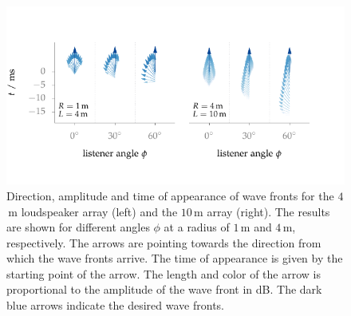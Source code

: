 \begin{figure}
    \centering
    \includegraphics{fig5_15/fig5_15}
    \caption{Direction, amplitude and time of appearance of wave fronts for the
    $4$\,m loudspeaker array (left) and the $10$\,m array (right). The results
    are shown for different angles $\phi$ at a radius of $1$\,m and $4$\,m,
    respectively. The arrows are pointing towards
    the direction from which the wave fronts arrive. The
    time of appearance is given by the starting point of the arrow.
    The length and color of the arrow is proportional to the amplitude of the
    wave front in dB.
    The dark blue arrows indicate the desired wave fronts.
    }
    \label{fig:fs_direction}
    \vspace{-0.7cm}
\end{figure}

